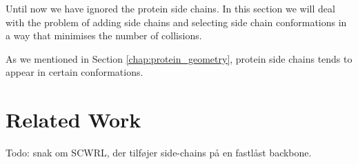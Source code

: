 Until now we have ignored the protein side chains. In this section we
will deal with the problem of adding side chains and selecting side
chain conformations in a way that minimises the number of collisions.

As we mentioned in Section \ref{chap:protein_geometry}, protein side
chains tends to appear in certain conformations. 

\section{Related Work}
Todo: snak om SCWRL, der tilføjer side-chains på en fastlåst backbone.

